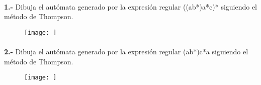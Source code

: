 \documentclass[11pt,a4paper]{report}
\begin{document}
\paragraph{}

\paragraph{}
\textbf{1.-} Dibuja el autómata generado por la expresión regular ((a\textbar b*)a*c)* siguiendo el método de Thompson.
\begin{figure}[ht!]
\centering
\texttt{[image: ]}
\end{figure}\paragraph{}
\textbf{2.-} Dibuja el autómata generado por la expresión regular (a\textbar b*)c*a siguiendo el método de Thompson.
\begin{figure}[ht!]
\centering
\texttt{[image: ]}
\end{figure}
\end{document}
